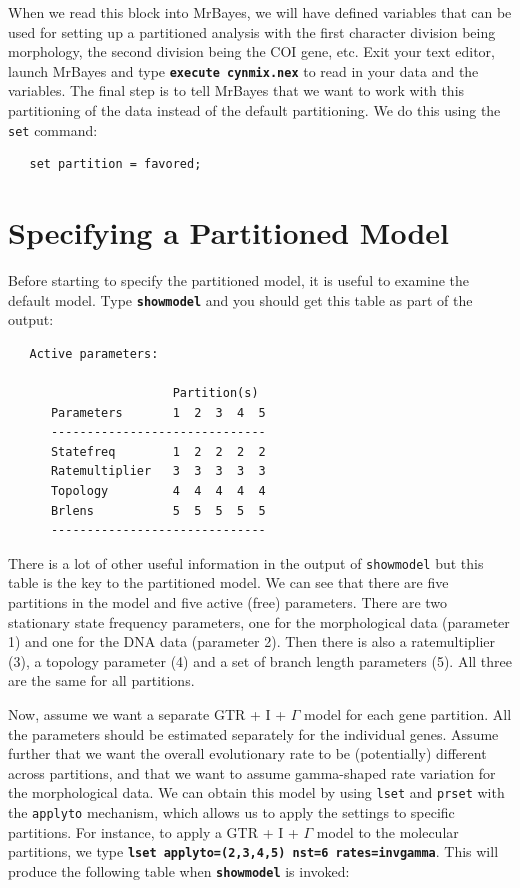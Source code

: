 \documentclass[12pt]{book}
\newcommand{\ttt}[1]{\texttt{#1}}
\newcommand{\tb}[1]{\ttt{\textbf{#1}}}
\begin{document}
When we read this block into MrBayes, we will have defined variables that can be used for setting
up a partitioned analysis with the first character division being morphology, the second division
being the COI gene, etc. Exit your text editor, launch MrBayes and type \tb{execute cynmix.nex}
to read in your data and the variables. The final step is to tell MrBayes that we want to work with
this partitioning of the data instead of the default partitioning. We do this using the \ttt{set}
command:

\begin{singlespacing}
\footnotesize
\begin{verbatim}
   set partition = favored;
\end{verbatim}
\normalsize
\end{singlespacing}


\section{Specifying a Partitioned Model}

Before starting to specify the partitioned model, it is useful to examine the default model. Type
\tb{showmodel} and you should get this table as part of the output:

\begin{singlespacing}
\footnotesize
\begin{verbatim}
   Active parameters:

                       Partition(s)
      Parameters       1  2  3  4  5
      ------------------------------
      Statefreq        1  2  2  2  2
      Ratemultiplier   3  3  3  3  3
      Topology         4  4  4  4  4
      Brlens           5  5  5  5  5
      ------------------------------
\end{verbatim}
\normalsize
\end{singlespacing}

There is a lot of other useful information in the output of \ttt{showmodel} but this table is the
key to the partitioned model. We can see that there are five partitions in the model and five
active (free) parameters. There are two stationary state frequency parameters, one for the
morphological data (parameter 1) and one for the DNA data (parameter 2). Then there is also a
ratemultiplier (3), a topology parameter (4) and a set of branch length parameters (5). All three
are the same for all partitions.

Now, assume we want a separate GTR + I + $\Gamma$ model for each gene partition. All the parameters
should be estimated separately for the individual genes. Assume further that we want the overall
evolutionary rate to be (potentially) different across partitions, and that we want to assume
gamma-shaped rate variation for the morphological data. We can obtain this model by using
\ttt{lset} and \ttt{prset} with the \ttt{applyto} mechanism, which allows us to apply the settings
to specific partitions. For instance, to apply a GTR + I + $\Gamma$ model to the molecular partitions,
we type \tb{lset applyto=(2,3,4,5) nst=6 rates=invgamma}. This will produce the following table
when \tb{showmodel} is invoked:
\end{document}
